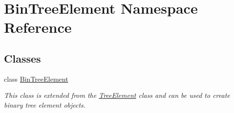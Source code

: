 \hypertarget{namespace_bin_tree_element}{}\section{Bin\+Tree\+Element Namespace Reference}
\label{namespace_bin_tree_element}
\subsection*{Classes}
\begin{DoxyCompactItemize}
\item 
class \hyperlink{class_bin_tree_element_1_1_bin_tree_element}{Bin\+Tree\+Element}
\begin{DoxyCompactList}\small\item\em This class is extended from the \hyperlink{namespace_tree_element}{Tree\+Element} class and can be used to create binary tree element objects. \end{DoxyCompactList}\end{DoxyCompactItemize}
